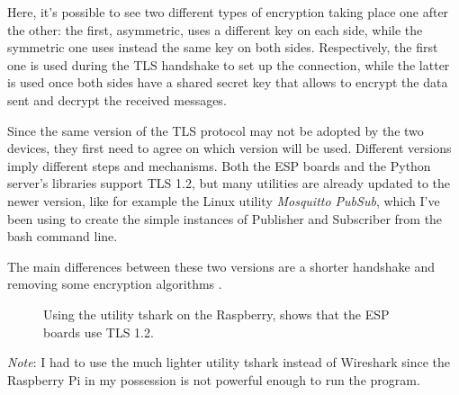 \documentclass[target=bach,aauheader=,style=]{thud}
\begin{document}
Here, it's possible to see two different types of encryption taking place one after the other: the first, asymmetric, uses a different key on each side, while the symmetric one uses instead the same key on both sides. Respectively, the first one is used during the TLS handshake to set up the connection, while the latter is used once both sides have a shared secret key that allows to encrypt the data sent and decrypt the received messages.

Since the same version of the TLS protocol may not be adopted by the  two devices, they first need to agree on which version will be used. Different versions imply different steps and mechanisms. Both the ESP boards and the Python server's libraries support TLS 1.2, but many utilities are already updated to the newer version, like for example the Linux utility \emph{Mosquitto PubSub}, which I've been using to create the simple instances of Publisher and Subscriber from the bash command line.

The main differences between these two versions are a shorter handshake and removing some encryption algorithms \cite{tlsdifferences} \cite{cloudflaretls}.


\begin{figure}[h!]
	\centering
	\caption{Using the utility tshark on the Raspberry, shows that the ESP boards use TLS 1.2.}
	\label{fig:tshark}
\end{figure}

\emph{Note}: I had to use the much lighter utility tshark instead of Wireshark since the Raspberry Pi in my possession is not powerful enough to run the program.
\newpage
\end{document}
